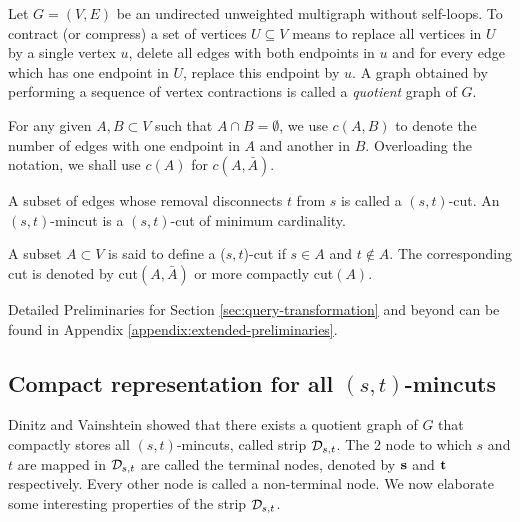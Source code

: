 
Let $G=(V,E)$ be an undirected unweighted multigraph without self-loops. To contract (or compress) a set of vertices $U\subseteq V$ means to replace all vertices in $U$ by a single vertex $u$, delete all edges with both endpoints in $u$ and for every edge which has one endpoint in $U$, replace this endpoint by $u$. A graph obtained by performing a sequence of vertex contractions is called a {\em quotient} graph of $G$.


For any given $A,B\subset V$ such that $A\cap B=\emptyset$, we use $c(A,B)$ to denote the number of edges with one endpoint in $A$
and another in $B$. Overloading the notation, we shall use $c(A)$ for $c(A,\bar{A})$.

\begin{definition}[$(s,t)$-cut]
A subset of edges whose removal disconnects $t$ from $s$ is called a $(s,t)$-cut. An $(s,t)$-mincut is a $(s,t)$-cut of minimum cardinality. 
\label{def:(u,v)-cut}
\end{definition}

\begin{definition}
A subset $A\subset V$ is said to define a ($s,t$)-cut if $s\in A$ and $t\notin A$. The corresponding cut is denoted by cut$(A,\bar{A})$ or more compactly cut$(A)$.  
\label{def:set-definiting-a-cut}
\end{definition}

Detailed Preliminaries for Section \ref{sec:query-transformation} and beyond can be found in Appendix \ref{appendix:extended-preliminaries}.

\subsection{Compact representation for all \texorpdfstring{$(s,t)$}{(s,t)}-mincuts}
Dinitz and Vainshtein \cite{DBLP:journals/siamcomp/DinitzV00} showed that there exists a quotient graph of $G$ that compactly stores all $(s,t)$-mincuts, called strip ${\cal D}_{s,t}$. The 2 node to which $s$ and $t$ are mapped in ${\cal D}_{s,t}$ are called the terminal nodes, denoted by ${\bf s}$ and ${\bf t}$ respectively. Every other node is called a non-terminal node. We now elaborate some interesting properties of the strip ${\cal D}_{s,t}$.

